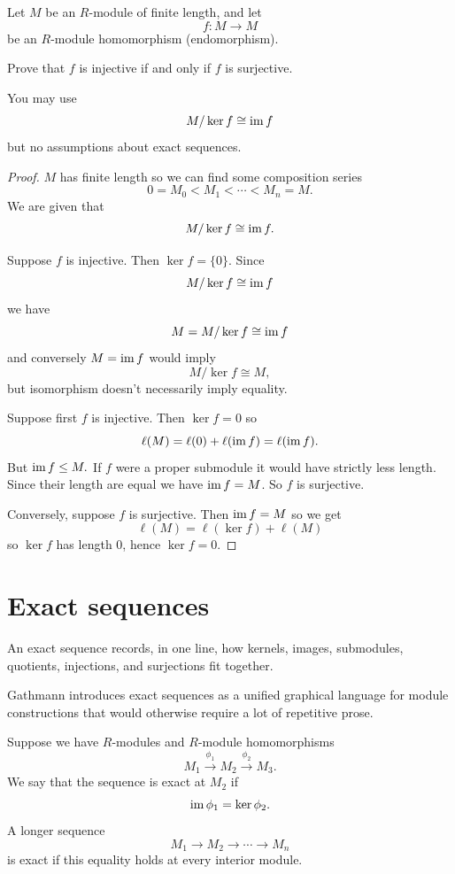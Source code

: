 \documentclass[11pt]{article}
\begin{document}
\begin{prob}
    Let $M$ be an $R$-module of finite length, and 
    let     
    \[
        f : M \to M 
    \]
    be an $R$-module homomorphism (endomorphism). 

    Prove that 
    $f$ is injective if and only if 
    $f$ is surjective. 

    You may use 
    \[
        M/\ker f \cong \operatorname{im} f 
    \]
    but no assumptions about exact sequences. 
\end{prob}
\begin{proof}
    $M$ has finite length so we can 
    find some composition series 
    \[
        0 = M_0 < M_1 < \cdots < M_n = M. 
    \]
    We are given that 
    \[
        M/\ker f \cong \operatorname{im} f. 
    \]
    
    Suppose $f$ is injective. Then $\ker f = \{0\}$. 
    Since 
    \[
        M/\ker f \cong \operatorname{im} f 
    \]
    we have 
    \[
        M = M/\ker f \cong \operatorname{im} f  
    \]
    and conversely $M = \operatorname{im} f$ would imply 
    \[
        M/\ker f \cong M, 
    \]
    but isomorphism doesn't necessarily imply equality.
    
    Suppose first $f$ is injective. Then 
    $\ker f = 0$ so 
    \[
        \ell(M) = \ell(0) + \ell(\operatorname{im} f) = \ell(\operatorname{im} f). 
    \]
    But $\operatorname{im} f \leq M.$ If $f$ were a proper submodule 
    it would have strictly less length. 
    Since their length are equal we have $\operatorname{im} f = M$. 
    So $f$ is surjective. 
    
    Conversely, suppose $f$ is surjective. Then 
    $\operatorname{im} f = M$ so we get 
    \[
        \ell(M) = \ell(\ker f) + \ell(M) 
    \]
    so $\ker f$ has length $0$, hence $\ker f = 0$. 
\end{proof}

\newpage 

\section{Exact sequences}

An exact sequence records, in one line, how 
kernels, images, submodules, quotients, injections, 
and surjections fit together. 

Gathmann introduces exact sequences as a 
unified graphical language for module constructions 
that would otherwise require a lot of repetitive 
prose. 

\begin{defn}
    Suppose we have $R$-modules and 
    $R$-module homomorphisms 
    \[
        M_1 \overset{\phi_1}{\to} M_2 
        \overset{\phi_2}{\to} M_3. 
    \]
    We say that the sequence is exact at $M_2$ 
    if 
    \[
        \operatorname{im} \phi_1 = \ker \phi_2. 
    \] 
    A longer sequence 
    \[
        M_1 \to M_2 \to \cdots \to M_n
    \]
    is exact if this equality holds at every 
    interior module. 
\end{defn}
\end{document}
